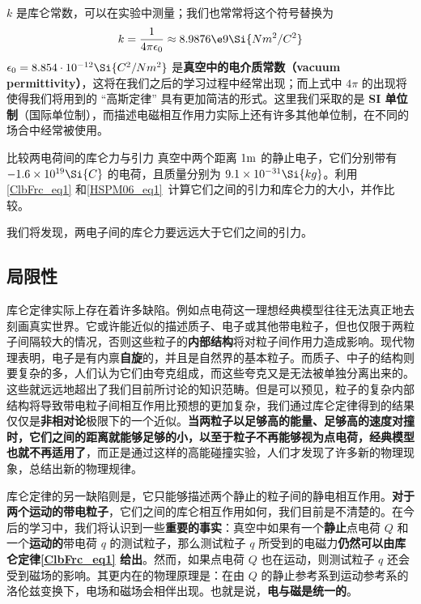 $k$ 是库仑常数，可以在实验中测量；我们也常常将这个符号替换为
\begin{equation}
k = \frac{1}{4\pi\epsilon_0} \approx 8.9876\e9 \Si{N m^2/C^2}
\end{equation}
$\epsilon_0=8.854\cdot 10^{-12} \Si{C^2/Nm^2}$ 是\textbf{真空中的电介质常数（vacuum permittivity）}，这将在我们之后的学习过程中经常出现；而上式中 $4\pi$ 的出现将使得我们将用到的 “高斯定律” 具有更加简洁的形式。这里我们采取的是\textbf{ SI 单位制}（国际单位制），而描述电磁相互作用力实际上还有许多其他单位制，在不同的场合中经常被使用。

\begin{exercise}{比较两电荷间的库仑力与引力}
真空中两个距离 $1 \rm m$ 的静止电子，它们分别带有 $-1.6\times 10^{19} \Si{C}$ 的电荷，且质量分别为 $9.1\times 10^{-31} \Si{kg}$。利用\autoref{ClbFrc_eq1} 和\autoref{HSPM06_eq1}~计算它们之间的引力和库仑力的大小，并作比较。
\end{exercise}
我们将发现，两电子间的库仑力要远远大于它们之间的引力。
\subsection{局限性}
库仑定律实际上存在着许多缺陷。例如点电荷这一理想经典模型往往无法真正地去刻画真实世界。它或许能近似的描述质子、电子或其他带电粒子，但也仅限于两粒子间隔较大的情况，否则这些粒子的\textbf{内部结构}将对粒子间作用力造成影响。现代物理表明，电子是有内禀\textbf{自旋}的，并且是自然界的基本粒子。而质子、中子的结构则要复杂的多，人们认为它们由夸克组成，而这些夸克又是无法被单独分离出来的。这些就远远地超出了我们目前所讨论的知识范畴。但是可以预见，粒子的复杂内部结构将导致带电粒子间相互作用比预想的更加复杂，我们通过库仑定律得到的结果仅仅是\textbf{非相对论}极限下的一个近似。\textbf{当两粒子以足够高的能量、足够高的速度对撞时，它们之间的距离就能够足够的小，以至于粒子不再能够视为点电荷，经典模型也就不再适用了}，而正是通过这样的高能碰撞实验，人们才发现了许多新的物理现象，总结出新的物理规律。

库仑定律的另一缺陷则是，它只能够描述两个静止的粒子间的静电相互作用。\textbf{对于两个运动的带电粒子}，它们之间的库仑相互作用如何，我们目前是不清楚的。在今后的学习中，我们将认识到一些\textbf{重要的事实}：真空中如果有一个\textbf{静止}点电荷 $Q$ 和一个\textbf{运动的}带电荷 $q$ 的测试粒子，那么测试粒子 $q$ 所受到的电磁力\textbf{仍然可以由库仑定律\autoref{ClbFrc_eq1} 给出}。然而，如果点电荷 $Q$ 也在运动，则测试粒子 $q$ 还会受到磁场的影响。其更内在的物理原理是：在由 $Q$ 的静止参考系到运动参考系的洛伦兹变换下，电场和磁场会相伴出现。也就是说，\textbf{电与磁是统一的}。